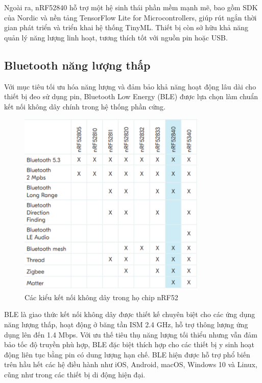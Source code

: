 Ngoài ra, nRF52840 hỗ trợ một hệ sinh thái phần mềm mạnh mẽ, bao gồm SDK 
của Nordic và nền tảng TensorFlow Lite for Microcontrollers, giúp rút 
ngắn thời gian phát triển và triển khai hệ thống TinyML. Thiết bị còn 
sở hữu khả năng quản lý năng lượng linh hoạt, tương thích tốt với nguồn pin hoặc USB. 





\subsection{Bluetooth năng lượng thấp}

Với mục tiêu tối ưu hóa năng lượng và đảm bảo khả năng hoạt động lâu dài 
cho thiết bị đeo sử dụng pin, Bluetooth Low Energy (BLE) được lựa chọn 
làm chuẩn kết nối không dây chính trong hệ thống phần cứng.

\begin{figure}[!ht]
		\centering
 		\includegraphics[width=0.8\textwidth]{images/ble.png}
		\caption{Các kiểu kết nối không dây trong họ chip nRF52}
		\label{ble}
\end{figure}

BLE là giao thức kết nối không dây được thiết kế chuyên biệt cho 
các ứng dụng năng lượng thấp, hoạt động ở băng tần ISM 2.4 GHz, 
hỗ trợ thông lượng ứng dụng lên đến 1.4 Mbps. Với ưu thế tiêu thụ năng 
lượng tối thiểu nhưng vẫn đảm bảo tốc độ truyền phù hợp, BLE đặc biệt 
thích hợp cho các thiết bị y sinh hoạt động liên tục bằng pin có dung 
lượng hạn chế. BLE hiện được hỗ trợ phổ biến trên hầu hết các hệ điều 
hành như iOS, Android, macOS, Windows 10 và Linux, cũng như trong các 
thiết bị di động hiện đại.

